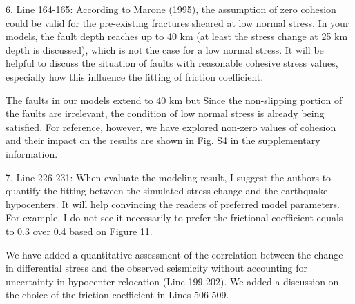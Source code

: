 \documentclass[12pt]{article}
\begin{document}
\begin{response}{6. Line 164-165: According to Marone (1995), the assumption of zero cohesion could be valid for the pre-existing fractures sheared at low normal stress. In your models, the fault depth reaches up to 40 km (at least the stress change at 25 km depth is discussed), which is not the case for a low normal stress. It will be helpful to discuss the situation of faults with reasonable cohesive stress values, especially how this influence the fitting of friction coefficient.}

    The faults in our models extend to 40 km but  Since the non-slipping portion of the faults are irrelevant, the condition of low normal stress is already being satisfied. For reference, however, we have explored non-zero values of cohesion and their impact on the results are shown in Fig. S4 in the supplementary information.
\end{response}

\begin{response}{7. Line 226-231: When evaluate the modeling result, I suggest the authors to quantify the fitting between the simulated stress change and the earthquake hypocenters. It will help convincing the readers of preferred model parameters. For example, I do not see it necessarily to prefer the frictional coefficient equals to 0.3 over 0.4 based on Figure 11.}

   We have added a quantitative assessment
   of the correlation between the change in differential stress and the observed seismicity  without accounting for uncertainty in hypocenter relocation (Line 199-202). We added a discussion on the choice of the friction coefficient in Lines 506-509.
\end{response}
\end{document}
